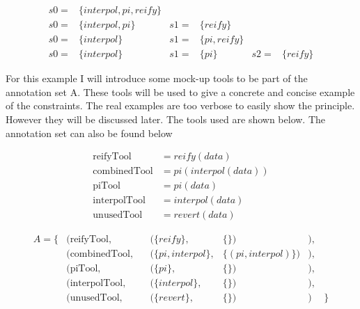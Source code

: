 \documentclass{article}
\begin{document}
 


\begin{align}
   s0=& \{interpol,pi,reify\} &   &                 &   & \nonumber  \\
    s0=& \{interpol,pi\}          & s1=& \{reify\}    &   & \nonumber\\
    s0=& \{interpol\}             & s1=& \{pi,reify\} &   & \nonumber\\
    s0=& \{interpol\}             & s1=& \{pi\}& s2=& \{reify\} \label{eq:states1}
\end{align}

For this example I will introduce some mock-up tools to be part of the annotation set A. These tools will be used to give a concrete and concise example of the constraints. The real examples are too verbose to easily show the principle. However they will be discussed later. The tools used are shown below. The annotation set can also be found below

\begin{align}
    \text{reifyTool} &= reify(data) \nonumber \\
    \text{combinedTool} &= pi(interpol(data)) \nonumber\\
    \text{piTool} &= pi(data) \nonumber\\
    \text{interpolTool} &= interpol(data) \nonumber\\
    \text{unusedTool} &= revert(data) \label{eq:allsimpletools}
\end{align}

\begin{align}
    A =  \{ & (\text{reifyTool},& & (\{reify \} ,& \{\})&), \nonumber\\ 
    & (\text{combinedTool},& & (\{pi,interpol \} ,& \{(pi,interpol)\})&), \nonumber\\ 
    & (\text{piTool},& & (\{pi \} ,& \{\})&), \nonumber\\ 
    & (\text{interpolTool},& & (\{interpol \} ,& \{\})&),\nonumber\\ 
    & (\text{unusedTool},& & (\{revert \} ,& \{\})&)   \label{eq:toolannotations}
    &\}
\end{align}
\end{document}
